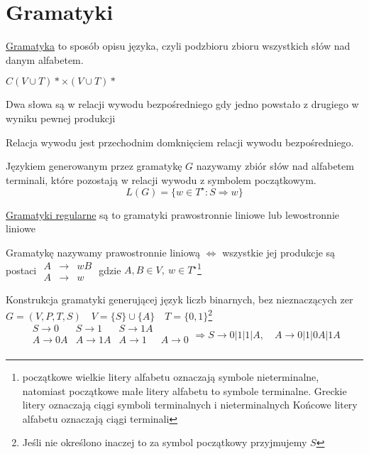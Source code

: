 \section{Gramatyki}
	
	\begin{df}
	\href{http://pl.wikipedia.org/wiki/Gramatyka_formalna}{Gramatyka} to sposób opisu języka, czyli podzbioru zbioru wszystkich
	 słów nad danym alfabetem.
	\end{df}
	\begin{df}
	$C(V \cup T)* \times (V \cup T)*$
	\end{df}
	
	\begin{tw}
	Dwa słowa są w relacji wywodu bezpośredniego gdy jedno powstało z drugiego w wyniku pewnej produkcji
	\end{tw}
	
	\begin{df}
	Relacja wywodu jest przechodnim domknięciem relacji wywodu bezpośredniego.
	\end{df}
	
	\begin{df}
	Językiem generowanym przez gramatykę $G$ nazywamy zbiór słów nad alfabetem terminali, które pozostają w relacji wywodu z 
	symbolem początkowym.
	$$ L(G) = \{ w\in T^\star: S \Rightarrow w \} $$
	\end{df}
	
	\begin{df}
	\href{http://pl.wikipedia.org/wiki/Gramatyka_regularna}{Gramatyki regularne} są to gramatyki prawostronnie liniowe lub 
	lewostronnie liniowe
	\end{df}
	
	\begin{df}
	Gramatykę nazywamy prawostronnie liniową $\Leftrightarrow$ wszystkie jej produkcje są postaci $\begin{matrix}
	A&\rightarrow&wB \\
	A&\rightarrow&w
	\end{matrix}$
	gdzie $A, B \in V, ~ w\in T^\star$\footnote{początkowe wielkie litery alfabetu oznaczają symbole nieterminalne, 
	natomiast początkowe małe litery alfabetu to symbole terminalne. Greckie litery oznaczają ciągi symboli terminalnych i nieterminalnych
	Końcowe litery alfabetu oznaczają ciągi terminali}	 
	\end{df}
	
	\begin{przyklad}
		Konstrukcja gramatyki generującej język liczb binarnych, bez nieznaczących zer \\
		$G = (V, P, T, S) \quad V = \{S\} \cup \{A\} \quad T = \{0, 1\}$\footnote{Jeśli nie określono inaczej to 
		za symbol początkowy przyjmujemy $S$}
		$$
		\begin{matrix}
		S \to 0 & S \to 1 & S \to 1A \\
		A \to 0A & A \to 1A & A \to 1 & A \to 0\\		
		\end{matrix}
		\Rightarrow
		S \to 0|1|1|A, \quad A \to 0|1|0A|1A
		$$
	\end{przyklad}		
	
